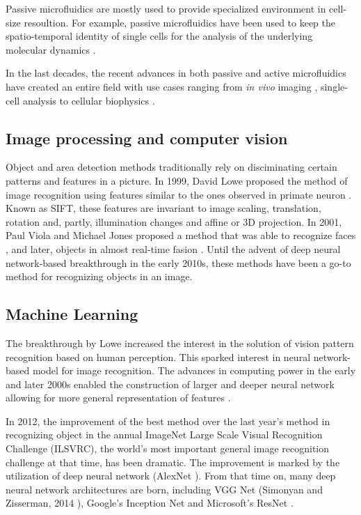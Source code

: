 \documentclass[pdftex,12pt,a4paper]{report}
\begin{document}
Passive microfluidics are mostly used to provide specialized environment in cell-size resoultion. For example, passive microfluidics have been used to keep the spatio-temporal identity of single cells for the analysis of the underlying molecular dynamics \cite{mu2013microfluidics, sekhavati2015marker}.

In the last decades, the recent advances in both passive and active microfluidics have created an entire field \cite{whitesides2006origins} with use cases ranging from \textit{in vivo} imaging \cite{chronis2007microfluidics}, single-cell analysis \cite{wheeler2003microfluidic} to cellular biophysics \cite{di2010bacterial}.

\subsection{Image processing and computer vision}
\label{subsection:cv_advances}

Object and area detection methods traditionally rely on disciminating certain patterns and features in a picture. In 1999, David Lowe proposed the method of image recognition using features similar to the ones observed in primate neuron \cite{lowe1999object}. Known as SIFT, these features are invariant to image scaling, translation, rotation and, partly, illumination changes and affine or 3D projection. In 2001, Paul Viola and Michael Jones proposed a method that was able to recognize faces \cite{viola2004robust}, and later, objects in almost real-time fasion \cite{viola2001rapid}. Until the advent of deep neural network-based breakthrough in the early 2010s, these methods have been a go-to method for recognizing objects in an image.

\subsection{Machine Learning}
\label{subsection:ml_advances}

The breakthrough by Lowe increased the interest in the solution of vision pattern recognition based on human perception. This sparked interest in neural network-based model for image recognition. The advances in computing power in the early and later 2000s enabled the construction of larger and deeper neural network allowing for more general representation of features \cite{goodfellow2016deep}.

In 2012, the improvement of the best method over the  last year's method in recognizing object in the annual ImageNet Large Scale Visual Recognition Challenge (ILSVRC), the world's most important general image recognition challenge at that time, has been dramatic. The improvement is marked by the utilization of deep neural network (AlexNet \cite{krizhevsky2012imagenet}). From that time on, many deep neural network architectures are born, including VGG Net (Simonyan  and Zisserman, 2014 \cite{simonyan2014very}), Google's Inception Net \cite{szegedy2015going} and Microsoft's ResNet \cite{he2016deep}.
\end{document}
